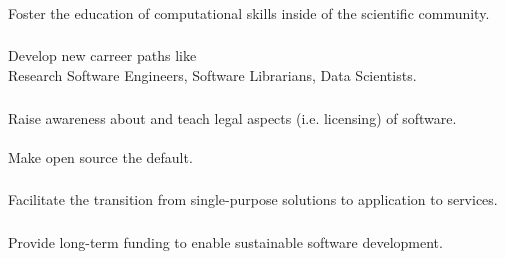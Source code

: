 \documentclass{beamer}
\begin{document}
\begin{frame}
  \frametitle{}
  \begin{block}{}
    \begin{center}
      Foster the education of computational skills inside of the
      scientific community.
    \end{center}
  \end{block}
\end{frame}

\begin{frame}
  \frametitle{}
  \begin{block}{}
    \begin{center}
      Develop new carreer paths like\\ Research Software Engineers,
      Software Librarians, Data Scientists.
    \end{center}
  \end{block}
\end{frame}

\begin{frame}
  \frametitle{}
  \begin{block}{}
    \begin{center}
      Raise awareness about and teach legal aspects (i.e. licensing) of
      software.\\\ \\Make open source the default.
    \end{center}
  \end{block}
\end{frame}

\begin{frame}
  \frametitle{}
  \begin{block}{}
    \begin{center}
       Facilitate the transition from single-purpose solutions to
       application to services.
    \end{center}
  \end{block}
\end{frame}

\begin{frame}
  \frametitle{}
  \begin{block}{}
    \begin{center}
      Provide long-term funding to enable sustainable software
      development.
    \end{center}
  \end{block}
\end{frame}
\end{document}
